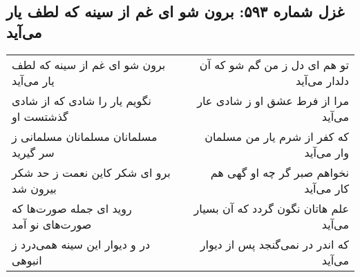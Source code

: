 \begin{center}
\section*{غزل شماره ۵۹۳: برون شو ای غم از سینه که لطف یار می‌آید}
\label{sec:0593}
\begin{longtable}{l p{0.5cm} r}
برون شو ای غم از سینه که لطف یار می‌آید
&&
تو هم ای دل ز من گم شو که آن دلدار می‌آید
\\
نگویم یار را شادی که از شادی گذشتست او
&&
مرا از فرط عشق او ز شادی عار می‌آید
\\
مسلمانان مسلمانان مسلمانی ز سر گیرید
&&
که کفر از شرم یار من مسلمان وار می‌آید
\\
برو ای شکر کاین نعمت ز حد شکر بیرون شد
&&
نخواهم صبر گر چه او گهی هم کار می‌آید
\\
روید ای جمله صورت‌ها که صورت‌های نو آمد
&&
علم هاتان نگون گردد که آن بسیار می‌آید
\\
در و دیوار این سینه همی‌درد ز انبوهی
&&
که اندر در نمی‌گنجد پس از دیوار می‌آید
\\
\end{longtable}
\end{center}
